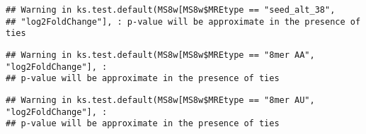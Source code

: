 \documentclass[
]{article}
\newenvironment{Shaded}{\begin{snugshade}}{\end{snugshade}}
\newcommand{\FunctionTok}[1]{\textcolor[rgb]{0.13,0.29,0.53}{\textbf{#1}}}
\newcommand{\NormalTok}[1]{#1}
\newcommand{\OtherTok}[1]{\textcolor[rgb]{0.56,0.35,0.01}{#1}}
\newcommand{\SpecialCharTok}[1]{\textcolor[rgb]{0.81,0.36,0.00}{\textbf{#1}}}
\newcommand{\StringTok}[1]{\textcolor[rgb]{0.31,0.60,0.02}{#1}}
\begin{document}
\begin{verbatim}
## Warning in ks.test.default(MS8w[MS8w$MREtype == "seed_alt_38",
## "log2FoldChange"], : p-value will be approximate in the presence of ties
\end{verbatim}

\begin{Shaded}
\end{Shaded}

\begin{verbatim}
## Warning in ks.test.default(MS8w[MS8w$MREtype == "8mer AA", "log2FoldChange"], :
## p-value will be approximate in the presence of ties
\end{verbatim}

\begin{Shaded}
\end{Shaded}

\begin{verbatim}
## Warning in ks.test.default(MS8w[MS8w$MREtype == "8mer AU", "log2FoldChange"], :
## p-value will be approximate in the presence of ties
\end{verbatim}
\end{document}
